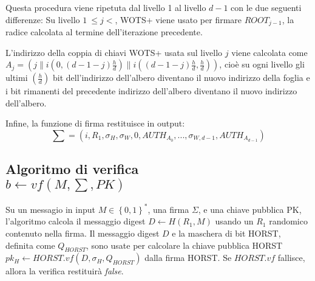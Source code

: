 Questa procedura viene ripetuta dal livello 1 al livello \(d - 1\) con le due seguenti differenze: Su livello \( 1 \ \leqslant j < \), WOTS+ viene usato per firmare \(ROOT_{j-1}\), la radice calcolata al termine dell'iterazione precedente.

L'indirizzo della coppia di chiavi WOTS+ usata sul livello \(j\) viene calcolata come \( A_j = (j\|i(0, (d - 1 - j)\frac{h}{d})\|i((d - 1 - j)\frac{h}{d}, \frac{h}{d})) \), cioè su ogni livello gli ultimi \((\frac{h}{d})\) bit dell'indirizzo dell'albero diventano il nuovo indirizzo della foglia e i bit rimanenti del precedente indirizzo dell'albero diventano il nuovo indirizzo dell'albero.

Infine, la funzione di firma restituisce in output:
\[ \sum = (i, R_1, \sigma_H, \sigma_W,0, AUTH_{A_0} , . . . , \sigma_{W,d-1}, AUTH_{A_{d-1}} ) \]

\subsection{Algoritmo di verifica\\\(b \leftarrow vf(M, \sum, PK)\)}
Su un messagio in input \( M \in \left\{0,1\right\}^* \), una firma \(\Sigma\), e una chiave pubblica PK, l'algoritmo calcola il messaggio digest \( D \leftarrow H(R_1,M) \) usando un \(R_1\) randomico contenuto nella firma. Il messaggio digest \(D\) e la maschera di bit HORST, definita come \(Q_{HORST}\), sono usate per calcolare la chiave pubblica HORST \( pk_H \leftarrow HORST.vf(D, \sigma_H, Q_{HORST}) \) dalla firma HORST. Se \(HORST.vf\) fallisce, allora la verifica restituirà \textit{false}.